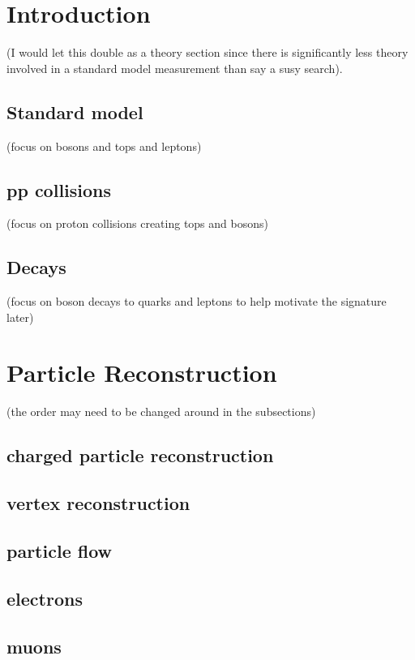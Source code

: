 \documentclass[12pt,chapterheads,oneside]{ucsd}
\begin{document}
\graphicspath{
{Figs/}
}




\chapter{Introduction}     
	(I would let this double as a theory section since there is significantly less theory involved in a standard model measurement than say a susy search).
	\section{Standard model}
		(focus on bosons and tops and leptons)
	\section{pp collisions}          
		(focus on proton collisions creating tops and bosons)
	\section{Decays}
    		(focus on boson decays to quarks and leptons to help motivate the signature later)



\chapter{Particle Reconstruction}
                (the order may need to be changed around in the subsections)
	\section{charged particle reconstruction}
	\section{vertex reconstruction}
	\section{particle flow}
	\section{electrons}
	\section{muons}
\end{document}
